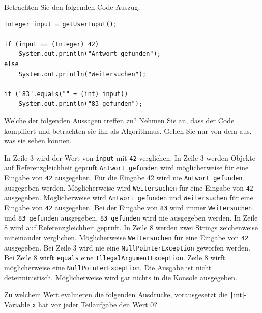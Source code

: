 \documentclass[11pt]{exam} %
\newcommand{\code}[1]{\texttt|#1|}
\newcommand{\fillinline}[1]{\ifprintanswers\fillin[\code{#1}][3cm]\fi\xrfill[-1pt]{0.2mm}}
\newcommand{\fillinlinexl}[1]{\ifprintanswers\fillin[\code{#1}][9cm]\fi\xrfill[-1pt]{0.2mm}}
\begin{document}
\begin{questions}
\question Betrachten Sie den folgenden Code-Auszug:
\begin{verbatim}
Integer input = getUserInput();

if (input == (Integer) 42)
	System.out.println("Antwort gefunden");
else
	System.out.println("Weitersuchen");
	
if ("83".equals("" + (int) input))
	System.out.println("83 gefunden");
\end{verbatim}
Welche der folgenden Aussagen treffen zu? Nehmen Sie an, dass der Code kompiliert und betrachten sie ihn als Algorithmus. Gehen Sie nur von dem aus, was sie sehen können. 
\begin{checkboxes}
\choice In Zeile 3 wird der Wert von \texttt{input} mit \texttt{42} verglichen.
\CorrectChoice In Zeile 3 werden Objekte auf Referenzgleichheit geprüft
\CorrectChoice \texttt{Antwort gefunden} wird möglicherweise für eine Eingabe von \texttt{42} ausgegeben.
\choice Für die Eingabe 42 wird nie \texttt{Antwort gefunden} ausgegeben werden.
\CorrectChoice Möglicherweise wird \texttt{Weitersuchen} für eine Eingabe von \texttt{42} ausgegeben.
\choice Möglicherweise wird \texttt{Antwort gefunden} und \texttt{Weitersuchen} für eine Eingabe von \texttt{42} ausgegeben.
\CorrectChoice Bei der Eingabe von \texttt{83} wird immer \texttt{Weitersuchen} und \texttt{83 gefunden} ausgegeben.
\choice \texttt{83 gefunden} wird nie ausgegeben werden.
\choice In Zeile 8 wird auf Referenzgleichheit geprüft.
\CorrectChoice In Zeile 8 werden zwei Strings zeichenweise miteinander verglichen.
\CorrectChoice Möglicherweise \texttt{Weitersuchen} für eine Eingabe von \texttt{42} ausgegeben.
\choice Bei Zeile 3 wird nie eine \texttt{NullPointerException} geworfen werden.
\choice Bei Zeile 8 wirft \texttt{equals} eine \texttt{IllegalArgumentException}.
\CorrectChoice Zeile 8 wirft möglicherweise eine \texttt{NullPointerException}.
\choice Die Ausgabe ist nicht deterministisch.
\CorrectChoice Möglicherweise wird gar nichts in die Konsole ausgegeben.
\end{checkboxes}
\question Zu welchem Wert evaluieren die folgenden Ausdrücke, vorausgesetzt die \code{int}-Variable \texttt{x} hat vor jeder Teilaufgabe den Wert 0?
\begin{parts}

\end{parts}
\end{questions}
\end{document}

